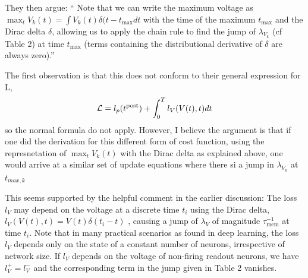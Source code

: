 \documentclass[a4paper]{article}
\newcommand{\blue}[1]{{\color{blue}#1}}
\begin{document}
They then argue: \blue{`` Note that we can write the maximum voltage as $\max_t V_k(t) = \int V_k(t) \delta(t-t_{\text{max}} dt$ with the time of the maximum $t_{\text{max}}$ and the Dirac delta $\delta$, allowing us to apply the chain rule to find the jump of $\lambda_{V_k}$ (cf Table 2) at time $t_{\text{max}}$ (terms containing the distributional derivative of $\delta$ are always zero).''}

The first observation is that this does not conform to their general expression for {\cal L},
\begin{align}
  {\cal L} = l_p(t^{\text{post}}) + \int_0^T l_V(V(t),t) dt
\end{align}
so the normal formula do not apply. However, I believe the argument is that if one did the derivation for this different form of cost function, using the represnetation of $\max_t V_k(t)$ with the Dirac delta as explained above, one would arrive at a similar set of update equations where there si a jump in $\lambda_{V_k}$ at $t_{max,k}$ 

This seems supported by the helpful comment in the earlier discussion: \blue{The loss $l_V$ may depend on the voltage at a discrete time $t_i$ using the Dirac delta,
$l_V (V(t), t) = V(t) \delta(t_i − t)$ , causing a jump of $\lambda_V$ of magnitude $\tau_{\text{mem}}^{-1}$ at time $t_i$. Note that in many practical
scenarios as found in deep learning, the loss $l_V$ depends only on the state of a constant number of neurons, irrespective of network size. If $l_V$ depends on the voltage of non-firing readout neurons, we have $ l^+_V = l^−_V$ and the corresponding term in the jump given in Table 2 vanishes.}
\end{document}
